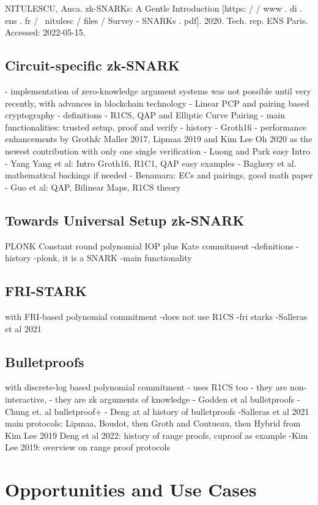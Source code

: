NITULESCU, Anca. zk-SNARKs: A Gentle Introduction [https:
/ / www . di . ens . fr / ~nitulesc / files / Survey - SNARKs . pdf].
2020. Tech. rep. ENS Paris. Accessed: 2022-05-15.

\subsection{Circuit-specific zk-SNARK}
- implementation of zero-knowledge argument systems was not possible until very recently, with advances in blockchain technology
- Linear PCP and pairing based cryptography
- definitions
- R1CS, QAP and Elliptic Curve Pairing
- main functionalities: trusted setup, proof and verify
- history
- Groth16
- performance enhancements by Groth\& Maller 2017, Lipmaa 2019 and Kim Lee Oh 2020 as the newest contribution with only one single verification
- Luong and Park easy Intro
- Yang Yang et al: Intro Groth16, R1C1, QAP easy examples
- Baghery et al. mathematical backings if needed
- Benamara: ECs and pairings, good math paper 
- Guo et al: QAP, Bilinear Maps, R1CS theory



\subsection{Towards Universal Setup zk-SNARK}
PLONK
Constant round polynomial IOP plus Kate commitment
-definitions
-history
-plonk, it is a SNARK
-main functionality

\subsection{FRI-STARK}
with FRI-based polynomial commitment
-does not use R1CS
-fri starks
-Salleras et al 2021

\subsection{Bulletproofs}
with discrete-log based polynomial commitment
- uses R1CS too
- they are non-interactive,
- they are zk arguments of knowledge
- Godden et al bulletproofs
- Chung et. al bulletproof+
- Deng at al history of bulletproofs
-Salleras et al 2021
main protocols: Lipmaa, Boudot, then Groth and Coutueau, then Hybrid from Kim Lee 2019
Deng et al 2022: history of range proofs, cuproof as example
-Kim Lee 2019: overview on range proof protocols


\section{Opportunities and Use Cases}


